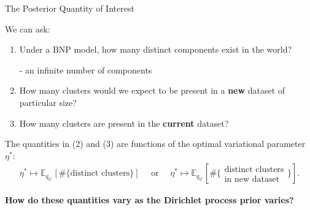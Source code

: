 \documentclass[10pt]{beamer}\usepackage[]{graphicx}\usepackage[]{color}
\newcommand{\Expect}{\mathbb{E}}
\begin{document}
\begin{frame}{The Posterior Quantity of Interest}

We can ask: 
\begin{enumerate}[(1)]
\item Under a BNP model, how many distinct components exist in the world? 
\pause\par 
- an infinite number of components  

\item How many clusters would we expect to be present in a {\bf new} dataset of particular size?

\pause

\item How many clusters are present in the {\bf current} dataset?
\pause

\end{enumerate}
\vspace{0.2in}
The quantities in (2) and (3) are functions of the optimal variational parameter $\eta^*$: 
%
\begin{align*}
\eta^* \mapsto
\Expect_{q_{\eta^*}} \left[ \#\{\text{distinct clusters}\} \right]
\quad \text{ or } \quad
\eta^* \mapsto
\Expect_{q_{\eta^*}} 
\left[\#\{\substack{\text{distinct clusters}\\\text{in new dataset}}\} \right].
\end{align*}

\begin{mdframed}[style=MyFrame]
\begin{center} 
{\bf How do these quantities vary as the Dirichlet process prior varies?}
\end{center}
\end{mdframed}

\end{frame}
\end{document}
